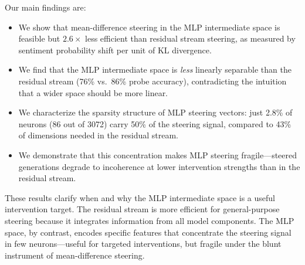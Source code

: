Our main findings are:
\begin{itemize}[leftmargin=*,itemsep=0pt,topsep=0pt]
    \item We show that mean-difference steering in the MLP intermediate space is feasible but $2.6\times$ less efficient than residual stream steering, as measured by sentiment probability shift per unit of KL divergence.
    \item We find that the MLP intermediate space is \emph{less} linearly separable than the residual stream (76\% vs.\ 86\% probe accuracy), contradicting the intuition that a wider space should be more linear.
    \item We characterize the sparsity structure of MLP steering vectors: just 2.8\% of neurons (86 out of 3072) carry 50\% of the steering signal, compared to 43\% of dimensions needed in the residual stream.
    \item We demonstrate that this concentration makes MLP steering fragile---steered generations degrade to incoherence at lower intervention strengths than in the residual stream.
\end{itemize}

These results clarify when and why the MLP intermediate space is a useful intervention target. The residual stream is more efficient for general-purpose steering because it integrates information from all model components. The MLP space, by contrast, encodes specific features that concentrate the steering signal in few neurons---useful for targeted interventions, but fragile under the blunt instrument of mean-difference steering.
